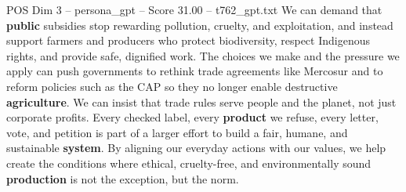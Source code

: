 \begin{textsample}{POS Dim 3 – persona\_gpt – Score 31.00 – t762\_gpt.txt}
We can demand that \textbf{public} subsidies stop rewarding pollution, cruelty, and exploitation, and instead support farmers and producers who protect biodiversity, respect Indigenous rights, and provide safe, dignified work.
The choices we make and the pressure we apply can push governments to rethink trade agreements like Mercosur and to reform policies such as the CAP so they no longer enable destructive \textbf{agriculture}.
We can insist that trade rules serve people and the planet, not just corporate profits.
Every checked label, every \textbf{product} we refuse, every letter, vote, and petition is part of a larger effort to build a fair, humane, and sustainable \textbf{system}.
By aligning our everyday actions with our values, we help create the conditions where ethical, cruelty-free, and environmentally sound \textbf{production} is not the exception, but the norm.

\end{textsample}
